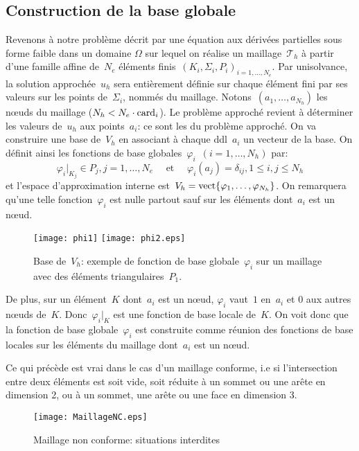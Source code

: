 \medskip
\subsection{Construction de la base globale}
Revenons à notre problème décrit par une équation aux dérivées partielles sous forme faible dans un domaine $\Omega$ sur lequel on réalise un maillage~$\mathcal{T}_h$ à partir d'une famille affine de~$N_e$ éléments finis~$(K_i, \Sigma_i, P_i)_{i=1,\ldots,N_e}$.
\medskip
Par unisolvance, la solution approchée~$u_h$ sera entièrement définie sur chaque élément fini par ses valeurs sur les points de~$\Sigma_i$, nommés  du maillage.
Notons~$(a_1,\ldots, a_{N_h})$ les nœuds du maillage ($N_h<N_e \cdot \mathrm{card}_i$).
Le problème approché revient à déterminer les valeurs de~$u_h$ aux points~$a_i$: ce sont les  du problème approché.
\medskip
On va construire une base de~$V_h$ en associant à chaque ddl~$a_i$ un vecteur de la base.
On définit ainsi les fonctions de base globales~$\varphi_i$~$(i = 1,\ldots, N_h)$ par:
\begin{equation}\varphi_i|_{K_j} \in P_j, j = 1,\ldots, N_e \quad \text{ et }\quad \varphi_i(a_j) = \delta_{ij}, 1\le i,j\le N_h\end{equation}
et l'espace d'approximation interne est~$V_h=\operatorname{vect}\{\varphi_1,\ldots, \varphi_{N_h}\}$.
On remarquera qu'une telle fonction~$\varphi_i$ est nulle partout sauf sur les éléments
dont~$a_i$ est un nœud.
\begin{figure}[ht]
\centering
\texttt{[image: phi1]} \hspace{5em} \texttt{[image: phi2.eps]}
\caption{\label{BaseVh} Base de~$V_h$: exemple de fonction de base globale~$\varphi_i$ sur un maillage avec des éléments triangulaires~$P_1$.}
\end{figure}

\medskip
De plus, sur un élément~$K$ dont~$a_i$ est un nœud, $\varphi_i$ vaut~$1$ en~$a_i$ et $0$ aux autres nœuds de~$K$. Donc~$\varphi_i|_K$ est une fonction de base locale de~$K$.
On voit donc que la fonction de base globale~$\varphi_i$ est construite comme réunion des fonctions de base locales sur les éléments du maillage dont~$a_i$ est un nœud.

\medskip
\begin{remarque} Ce qui précède est vrai dans le cas d'un maillage conforme, i.e si l'intersection entre deux éléments est soit vide, soit réduite à un sommet ou une arête en dimension 2, ou à un sommet, une arête ou une face en dimension 3.\end{remarque}
\begin{figure}[ht]
\centering
\texttt{[image: MaillageNC.eps]}
\caption{Maillage non conforme: situations interdites}\label{maillageNC}
\end{figure}

